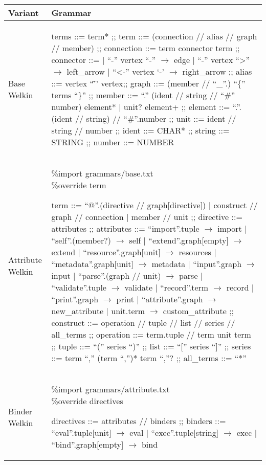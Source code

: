 \begin{table}[hbt!]
  \centering
    \begin{tabular}{| p{1.5cm} | p{9.5cm} |}%
    \hline
    Variant & Grammar \\\hline %
      \makecell{Base \\ Welkin} &
  \begin{bnf}
  terms ::= term* ;;
  term ::= (connection // alias // graph // member) ;;
  connection ::= term connector term ;;
	connector ::=
   | ``-'' vertex ``-'' $\to$ edge
   | ``-'' vertex ``>'' $\to$ left\_arrow
	 | ``<-'' vertex `-' $\to$ right\_arrow ;;
  alias ::= vertex ``\:\='' vertex;;
  graph ::= (member // ``\_''.) ``\{'' terms ``\}'' ;;
  member ::= ``.'' (ident // string // ``\#'' number) element*
  | unit? element+ ;;
  element ::= ``.''.(ident // string) // ``\#''.number ;;
	unit ::= ident // string // number ;;
  ident ::= CHAR* ;;
	string ::= STRING ;;
	number ::= NUMBER
\end{bnf} \\ %
   \hline
      Attribute Welkin &
  \makecell{\%import grammars/base.txt \\ \%override term}
  \begin{bnf}
  term ::= ``@''.(directive // graph[directive]) | construct // graph // connection | member // unit ;;
  directive ::= attributes ;;
  attributes ::= ``import''.tuple $\to$ import
  | ``self''.(member?) $\to$ self
  | ``extend''.graph[empty] $\to$ extend
  | ``resource''.graph[unit] $\to$ resources
  | ``metadata''.graph[unit] $\to$ metadata
  | ``input''.graph $\to$ input
  | ``parse''.(graph // unit) $\to$ parse
  | ``validate''.tuple $\to$ validate
  | ``record''.term $\to$ record
  | ``print''.graph $\to$ print
  | ``attribute''.graph $\to$ new\_attribute
  | unit.term $\to$ custom\_attribute ;;
  construct ::= operation // tuple // list // series // all\_terms ;;
  operation ::= term.tuple // term unit term ;;
  tuple ::= ``('' series ``)'' ;;
  list ::= ``['' series ``]'' ;;
  series ::= term ``,'' (term ``,'')* term ``,''? ;;
  all\_terms ::= ``*''
 \end{bnf} \\
   \hline
   Binder Welkin &
\makecell{\%import grammars/attribute.txt \\ \%override directives}
    \begin{bnf}
     directives ::= attributes // binders ;;
     binders ::= ``eval''.tuple[unit] $\to$ eval
     | ``exec''.tuple[string] $\to$ exec
     | ``bind''.graph[empty] $\to$ bind
   \end{bnf} \\
    \hline
    \end{tabular}
  \end{table}

